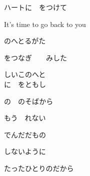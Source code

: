{
ハートに　をつけて

It's time to go back to you

のへとるがた

をつなぎ　　みした

しいこのへと
\\

に　をともし

の　のそばから

もう　れない

でんだだもの

しないように

たったひとりのだから

}